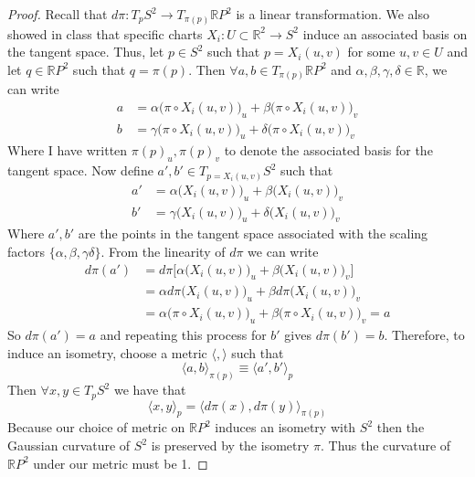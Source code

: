 \documentclass[a4paper, 11pt]{article}
\begin{document}
\begin{proof}
		\noindent Recall that $d\pi:T_p S^2 \to T_{\pi(p)}\mathbb{R}P^2$ is a linear transformation. We also showed in class that specific charts $X_i:U\subset \mathbb{R}^2 \to S^2$ induce an associated basis on the tangent space. Thus, let $p\in S^2$ such that $p= X_i(u,v)$ for some $u,v \in U$ and let $q\in \mathbb{R}P^2$ such that $q=\pi(p)$. Then $\forall a,b \in T_{\pi(p)}\mathbb{R}P^2$ and $\alpha,\beta,\gamma,\delta\in\mathbb{R}$, we can write 
			\begin{align*}
				a &= \alpha\Big(\pi \circ X_i(u,v)\Big)_u + \beta\Big(\pi \circ X_i(u,v)\Big)_v \\ 
				b &= \gamma\Big(\pi \circ X_i(u,v)\Big)_u + \delta\Big(\pi \circ X_i(u,v)\Big)_v 
			\end{align*} 
		\noindent Where I have written $\pi(p)_u, \pi(p)_v$ to denote the associated basis for the tangent space. Now define $a',b'\in T_{p=X_i(u,v)}S^2$ such that 
			\begin{align*}
				a' &= \alpha \Big(X_i(u,v)\Big)_u + \beta \Big(X_i(u,v)\Big)_v \\ 
				b' &= \gamma \Big(X_i(u,v)\Big)_u + \delta \Big(X_i(u,v)\Big)_v 
			\end{align*}
		\noindent Where $a',b'$ are the points in the tangent space associated with the scaling factors $\{\alpha,\beta,\gamma\delta\}$. From the linearity of $d\pi$ we can write
			\begin{align*}
				d\pi(a') &= d\pi \Big[ \alpha \Big(X_i(u,v)\Big)_u + \beta \Big(X_i(u,v)\Big)_v  \Big] \\ 
					&= \alpha d\pi\Big(X_i(u,v)\Big)_u + \beta d\pi\Big(X_i(u,v)\Big)_v \\ 
					&= \alpha\Big(\pi \circ X_i(u,v)\Big)_u + \beta\Big(\pi \circ X_i(u,v)\Big)_v = a 
			\end{align*}
		So $d\pi(a') = a$ and repeating this process for $b'$ gives $d\pi(b') = b$. Therefore, to induce an isometry, choose a metric $\langle , \rangle$ such that 
			\begin{equation*}
				\langle a, b \rangle_{\pi(p)} \equiv \langle a', b' \rangle_p 
			\end{equation*}
		Then $\forall x,y \in T_p S^2$ we have that 
			\begin{equation*}
				\big\langle x, y \big\rangle_p = \big\langle d\pi(x), d\pi(y)\big\rangle_{\pi(p)}  
			\end{equation*}
		Because our choice of metric on $\mathbb{R}P^2$ induces an isometry with $S^2$ then the Gaussian curvature of $S^2$ is preserved by the isometry $\pi$. Thus the curvature of $\mathbb{R}P^2$ under our metric must be 1. 
	\end{proof}
\end{document}
